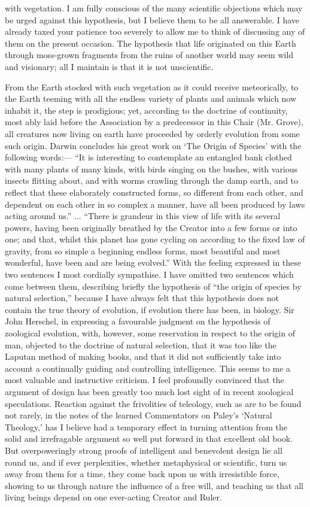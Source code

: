 \documentclass[a4paper, 11pt, oneside, english]{article}
\begin{document}
with vegetation. I am fully conscious of the many scientific objections which may be urged against this hypothesis, but I believe them to be all answerable. I have already taxed your patience too severely to allow me to think of discussing any of them on the present occasion. The hypothesis that life originated on this Earth through moss-grown fragments from the ruins of another world may seem wild and visionary; all I maintain is that it is not unscientific.

From the Earth stocked with such vegetation as it could receive meteorically, to the Earth teeming with all the endless variety of plants and animals which now inhabit it, the step is prodigious; yet, according to the doctrine of continuity, most ably laid before the Association by a predecessor in this Chair (Mr. Grove), all creatures now living on earth have proceeded by orderly evolution from some such origin. Darwin concludes his great work on `The Origin of Species' with the following words:--- ``It is interesting to contemplate an entangled bank clothed with many plants of many kinds, with birds singing on the bushes, with various insects flitting about, and with worms crawling through the damp earth, and to reflect that these elaborately constructed forms, so different from each other, and dependent on each other in so complex a manner, have all been produced by laws acting around us.'' ... ``There is grandeur in this view of life with its several powers, having been originally breathed by the Creator into a few forms or into one; and that, whilst this planet has gone cycling on according to the fixed law of gravity, from so simple a beginning endless forms, most beautiful and most wonderful, have been and are being evolved.'' With the feeling expressed in these two sentences I most cordially sympathise. I have omitted two sentences which come between them, describing briefly the hypothesis of ``the origin of species by natural selection,'' because I have always felt that this hypothesis does not contain the true theory of evolution, if evolution there has been, in biology. Sir John Herschel, in expressing a favourable judgment on the hypothesis of zoological evolution, with, however, some reservation in respect to the origin of man, objected to the doctrine of natural selection, that it was too like the Laputan method of making books, and that it did not sufficiently take into account a continually guiding and controlling intelligence. This seems to me a most valuable and instructive criticism. I feel profoundly convinced that the argument of design has been greatly too much lost sight of in recent zoological speculations. Reaction against the frivolities of teleology, such as are to be found not rarely, in the notes of the learned Commentators on Paley's `Natural Theology,' has I believe had a temporary effect in turning attention from the solid and irrefragable argument so well put forward in that excellent old book. But overpoweringly strong proofs of intelligent and benevolent design lie all round us, and if ever perplexities, whether metaphysical or scientific, turn us away from them for a time, they come back upon us with irresistible force, showing to us through nature the influence of a free will, and teaching us that all living beings depend on one ever-acting Creator and Ruler.
\clearpage
\end{document}
